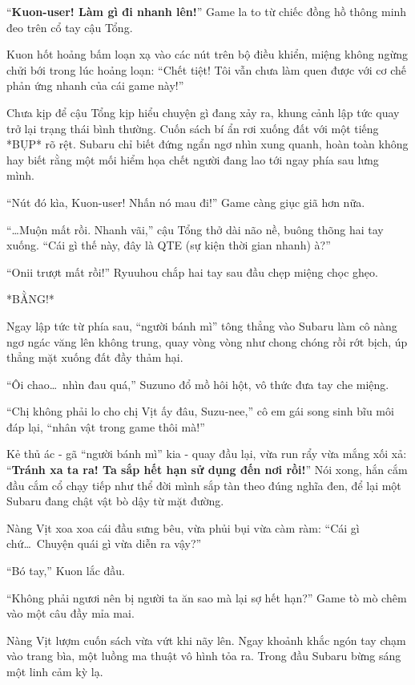 \documentclass[../main.tex]{subfiles}
\begin{document}
``\textbf{Kuon-user! Làm gì đi nhanh lên!}'' Game la to từ chiếc đồng hồ thông minh đeo trên cổ tay cậu Tổng.

Kuon hốt hoảng bấm loạn xạ vào các nút trên bộ điều khiển, miệng không ngừng chửi bới trong lúc hoảng loạn: ``Chết tiệt! Tôi vẫn chưa làm quen được với cơ chế phản ứng nhanh của cái game này!''

Chưa kịp để cậu Tổng kịp hiểu chuyện gì đang xảy ra, khung cảnh lập tức quay trở lại trạng thái bình thường. Cuốn sách bí ẩn rơi xuống đất với một tiếng *BỤP* rõ rệt. Subaru chỉ biết đứng ngẩn ngơ nhìn xung quanh, hoàn toàn không hay biết rằng một mối hiểm họa chết người đang lao tới ngay phía sau lưng mình.

``Nút đó kìa, Kuon-user! Nhấn nó mau đi!'' Game càng giục giã hơn nữa.

``\dots Muộn mất rồi. Nhanh vãi,'' cậu Tổng thở dài não nề, buông thõng hai tay xuống. ``Cái gì thế này, đây là QTE (sự kiện thời gian nhanh) à?''

``Onii trượt mất rồi!'' Ryuuhou chắp hai tay sau đầu chẹp miệng chọc ghẹo.

*BẰNG!*

Ngay lập tức từ phía sau, ``người bánh mì'' tông thẳng vào Subaru làm cô nàng ngơ ngác văng lên không trung, quay vòng vòng như chong chóng rồi rớt bịch, úp thẳng mặt xuống đất đầy thảm hại.

``Ôi chao\dots\ nhìn đau quá,'' Suzuno đổ mồ hôi hột, vô thức đưa tay che miệng.

``Chị không phải lo cho chị Vịt ấy đâu, Suzu-nee,'' cô em gái song sinh bĩu môi đáp lại, ``nhân vật trong game thôi mà!''

Kẻ thủ ác - gã ``người bánh mì'' kia - quay đầu lại, vừa run rẩy vừa mắng xối xả: ``\textbf{Tránh xa ta ra! Ta sắp hết hạn sử dụng đến nơi rồi!}'' Nói xong, hắn cắm đầu cắm cổ chạy tiếp như thể đời mình sắp tàn theo đúng nghĩa đen, để lại một Subaru đang chật vật bò dậy từ mặt đường.

Nàng Vịt xoa xoa cái đầu sưng bêu, vừa phủi bụi vừa càm ràm: ``Cái gì chứ\dots\ Chuyện quái gì vừa diễn ra vậy?''

``Bó tay,'' Kuon lắc đầu.

``Không phải ngươi nên bị người ta ăn sao mà lại sợ hết hạn?'' Game tò mò chêm vào một câu đầy mỉa mai.

Nàng Vịt lượm cuốn sách vừa vứt khi nãy lên. Ngay khoảnh khắc ngón tay chạm vào trang bìa, một luồng ma thuật vô hình tỏa ra. Trong đầu Subaru bừng sáng một linh cảm kỳ lạ.
\end{document}
